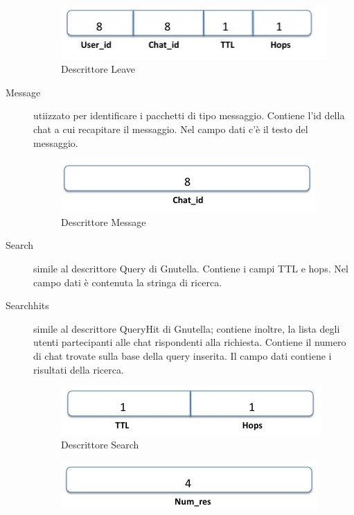 \begin{description}
\begin{figure}[H]
\begin{center}
\includegraphics[scale=0.7]{etc/leave.jpg}
\caption{Descrittore Leave}
\label{leave}
\end{center}
\end{figure}
\item[Message] utiizzato per identificare i pacchetti di tipo messaggio. Contiene l’id della chat a cui recapitare il messaggio. Nel campo dati c'è il testo del messaggio.
\begin{figure}[H]
\begin{center}
\includegraphics[scale=0.7]{etc/message.jpg}
\caption{Descrittore Message}
\label{message}
\end{center}
\end{figure}
\item[Search] simile al descrittore Query di Gnutella. Contiene i campi TTL e hops. Nel campo dati è contenuta la stringa di ricerca.
\item[Searchhits] simile al descrittore QueryHit di Gnutella; contiene inoltre, la lista degli utenti partecipanti alle chat rispondenti alla richiesta. Contiene il numero di chat trovate sulla base della query inserita. Il campo dati contiene i risultati della ricerca.
\begin{figure}[H]
\begin{center}
\includegraphics[scale=0.7]{etc/search.jpg}
\caption{Descrittore Search}
\label{search}
\end{center}
\end{figure}
\begin{figure}[H]
\begin{center}
\includegraphics[scale=0.7]{etc/searchhits.jpg}

\end{center}
\end{figure}
\end{description}
